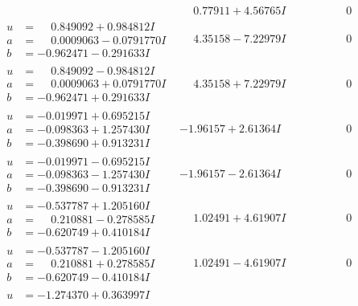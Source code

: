 \documentclass[1p]{elsarticle_modified}
\theoremstyle{definition}
\begin{document}
$$\begin{array}{c|c|c}
 & \phantom{-}0.77911 + 4.56765 I & \phantom{-0.000000 } 0 \\ \hline\begin{aligned}
u &= \phantom{-}0.849092 + 0.984812 I \\
a &= \phantom{-}0.0009063 - 0.0791770 I \\
b &= -0.962471 - 0.291633 I\end{aligned}
 & \phantom{-}4.35158 - 7.22979 I & \phantom{-0.000000 } 0 \\ \hline\begin{aligned}
u &= \phantom{-}0.849092 - 0.984812 I \\
a &= \phantom{-}0.0009063 + 0.0791770 I \\
b &= -0.962471 + 0.291633 I\end{aligned}
 & \phantom{-}4.35158 + 7.22979 I & \phantom{-0.000000 } 0 \\ \hline\begin{aligned}
u &= -0.019971 + 0.695215 I \\
a &= -0.098363 + 1.257430 I \\
b &= -0.398690 + 0.913231 I\end{aligned}
 & -1.96157 + 2.61364 I & \phantom{-0.000000 } 0 \\ \hline\begin{aligned}
u &= -0.019971 - 0.695215 I \\
a &= -0.098363 - 1.257430 I \\
b &= -0.398690 - 0.913231 I\end{aligned}
 & -1.96157 - 2.61364 I & \phantom{-0.000000 } 0 \\ \hline\begin{aligned}
u &= -0.537787 + 1.205160 I \\
a &= \phantom{-}0.210881 - 0.278585 I \\
b &= -0.620749 + 0.410184 I\end{aligned}
 & \phantom{-}1.02491 + 4.61907 I & \phantom{-0.000000 } 0 \\ \hline\begin{aligned}
u &= -0.537787 - 1.205160 I \\
a &= \phantom{-}0.210881 + 0.278585 I \\
b &= -0.620749 - 0.410184 I\end{aligned}
 & \phantom{-}1.02491 - 4.61907 I & \phantom{-0.000000 } 0 \\ \hline\begin{aligned}
u &= -1.274370 + 0.363997 I \\

\end{aligned}
\end{array}$$
\end{document}
